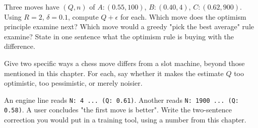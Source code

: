 \begin{exercises}
 Three moves have $(Q, n)$ of $A: (0.55, 100)$,
$B: (0.40, 4)$, $C: (0.62, 900)$. Using $R = 2$, $\delta = 0.1$, compute $Q + \epsilon$ for
each. Which move does the optimism principle examine next? Which move would a greedy
"pick the best average" rule examine? State in one sentence what the optimism rule is
buying with the difference.

 Give two specific ways a chess move differs
from a slot machine, beyond those mentioned in this chapter. For each, say whether it makes
the estimate $Q$ too optimistic, too pessimistic, or merely noisier.

 An engine line reads \texttt{N: 4 ... (Q: 0.61)}. Another
reads \texttt{N: 1900 ... (Q: 0.58)}. A user concludes "the first move is better". Write the
two-sentence correction you would put in a training tool, using a number from this chapter.

\end{exercises}
